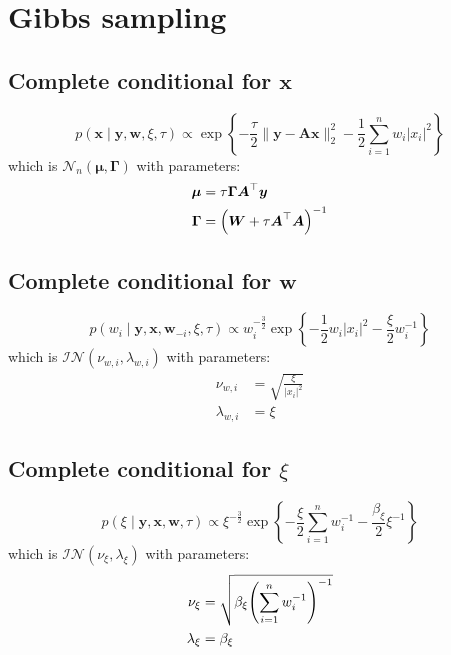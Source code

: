 \documentclass{article}
\numberwithin{equation}{section}
\newcommand{\lh}{\mathopen{}\mathclose\bgroup\left}
\newcommand{\rh}{\aftergroup\egroup\right}
\newcommand{\m}[1]{\boldsymbol{#1}}
\begin{document}
\clearpage
\section{Gibbs sampling}
\label{s:grls}
\subsection{Complete conditional for $\m{x}$}
\begin{equation}
p(\m{x} \mid \m{y}, \m{w}, \xi, \tau) \propto
 \exp\left\{
  -\frac{\tau}{2} \| \m{y} - \m{A} \m{x} \|_2^2
  -\frac{1}{2} \sum_{i=1}^n w_i |x_i|^2
 \right\}
\end{equation}
which is $\mathcal{N}_n(\m{\mu}, \m{\Gamma})$ with parameters:
\begin{equation}
\begin{aligned}
\m{\mu} &= \tau \m{\Gamma} \m{A}^\top \m{y}
\\
\m{\Gamma} &= \lh( \m{W} + \tau \m{A}^\top \m{A} \rh)^{-1}
\end{aligned}
\end{equation}

\subsection{Complete conditional for $\m{w}$}
\begin{equation}
p(w_i \mid \m{y}, \m{x}, \m{w}_{-i}, \xi, \tau) \propto
 w_i^{-\frac{3}{2}}
 \exp\left\{
  -\frac{1}{2} w_i |x_i|^2
  -\frac{\xi}{2} w_i^{-1}
 \right\}
\end{equation}
which is $\mathcal{IN}(\nu_{w,i}, \lambda_{w,i})$ with parameters:
\begin{equation}
\begin{aligned}
\nu_{w,i} &= \sqrt{\frac{\xi}{|x_i|^2}}
\\
\lambda_{w,i} &= \xi
\end{aligned}
\end{equation}

\subsection{Complete conditional for $\xi$}
\begin{equation}
p(\xi \mid \m{y}, \m{x}, \m{w}, \tau) \propto
 \xi^{-\frac{3}{2}}
 \exp\left\{
  -\frac{\xi}{2} \sum_{i=1}^n w_i^{-1}
  -\frac{\beta_\xi}{2} \xi^{-1}
 \right\}
\end{equation}
which is $\mathcal{IN}(\nu_\xi, \lambda_\xi)$ with parameters:
\begin{equation}
\begin{aligned}
\nu_\xi &= \sqrt{\beta_\xi \lh( \sum_{i=1}^n w_i^{-1} \rh)^{-1}}
\\
\lambda_\xi &= \beta_\xi
\end{aligned}
\end{equation}
\end{document}
